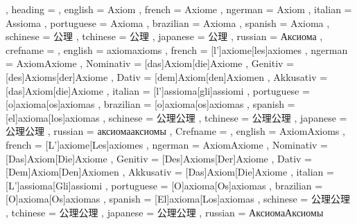   {
    , heading =   {
                    , english     = Axiom
                    , french      = Axiome
                    , ngerman     = Axiom
                    , italian     = Assioma
                    , portuguese  = Axioma
                    , brazilian   = Axioma
                    , spanish     = Axioma
                    , schinese    = 公理
                    , tchinese    = 公理
                    , japanese    = 公理
                    , russian     = Аксиома
                  }
    , crefname =  {
                    , english     = {axiom}{axioms}
                    , french      = [l']{axiome}[les]{axiomes}
                    , ngerman     = { {Axiom}{Axiome}
                                      , Nominativ = [das]{Axiom}[die]{Axiome}
                                      , Genitiv   = [des]{Axioms}[der]{Axiome}
                                      , Dativ     = [dem]{Axiom}[den]{Axiomen}
                                      , Akkusativ = [das]{Axiom}[die]{Axiome}
                                    }
                    , italian     = [l']{assioma}[gli]{assiomi}
                    , portuguese  = [o]{axioma}[os]{axiomas}
                    , brazilian   = [o]{axioma}[os]{axiomas}
                    , spanish     = [el]{axioma}[los]{axiomas}
                    , schinese    = {公理}{公理}
                    , tchinese    = {公理}{公理}
                    , japanese    = {公理}{公理}
                    , russian     = {аксиома}{аксиомы}
                  }
    , Crefname =  {
                    , english     = {Axiom}{Axioms}
                    , french      = [L']{axiome}[Les]{axiomes}
                    , ngerman     = { {Axiom}{Axiome}
                                      , Nominativ = [Das]{Axiom}[Die]{Axiome}
                                      , Genitiv   = [Des]{Axioms}[Der]{Axiome}
                                      , Dativ     = [Dem]{Axiom}[Den]{Axiomen}
                                      , Akkusativ = [Das]{Axiom}[Die]{Axiome}
                                    }
                    , italian     = [L']{assioma}[Gli]{assiomi}
                    , portuguese  = [O]{axioma}[Os]{axiomas}
                    , brazilian   = [O]{axioma}[Os]{axiomas}
                    , spanish     = [El]{axioma}[Los]{axiomas}
                    , schinese    = {公理}{公理}
                    , tchinese    = {公理}{公理}
                    , japanese    = {公理}{公理}
                    , russian     = {Аксиома}{Аксиомы}
                  }
  }

